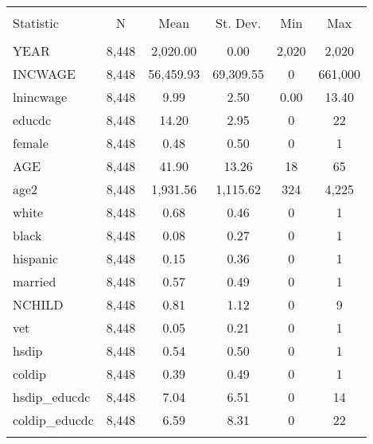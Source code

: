 
\begin{table}[!htbp] \centering 
  \caption{} 
  \label{} 
\begin{tabular}{@{\extracolsep{5pt}}lccccc} 
\\[-1.8ex]\hline 
\hline \\[-1.8ex] 
Statistic & \multicolumn{1}{c}{N} & \multicolumn{1}{c}{Mean} & \multicolumn{1}{c}{St. Dev.} & \multicolumn{1}{c}{Min} & \multicolumn{1}{c}{Max} \\ 
\hline \\[-1.8ex] 
YEAR & 8,448 & 2,020.00 & 0.00 & 2,020 & 2,020 \\ 
INCWAGE & 8,448 & 56,459.93 & 69,309.55 & 0 & 661,000 \\ 
lnincwage & 8,448 & 9.99 & 2.50 & 0.00 & 13.40 \\ 
educdc & 8,448 & 14.20 & 2.95 & 0 & 22 \\ 
female & 8,448 & 0.48 & 0.50 & 0 & 1 \\ 
AGE & 8,448 & 41.90 & 13.26 & 18 & 65 \\ 
age2 & 8,448 & 1,931.56 & 1,115.62 & 324 & 4,225 \\ 
white & 8,448 & 0.68 & 0.46 & 0 & 1 \\ 
black & 8,448 & 0.08 & 0.27 & 0 & 1 \\ 
hispanic & 8,448 & 0.15 & 0.36 & 0 & 1 \\ 
married & 8,448 & 0.57 & 0.49 & 0 & 1 \\ 
NCHILD & 8,448 & 0.81 & 1.12 & 0 & 9 \\ 
vet & 8,448 & 0.05 & 0.21 & 0 & 1 \\ 
hsdip & 8,448 & 0.54 & 0.50 & 0 & 1 \\ 
coldip & 8,448 & 0.39 & 0.49 & 0 & 1 \\ 
hsdip\_educdc & 8,448 & 7.04 & 6.51 & 0 & 14 \\ 
coldip\_educdc & 8,448 & 6.59 & 8.31 & 0 & 22 \\ 
\hline \\[-1.8ex] 
\end{tabular} 
\end{table} 
